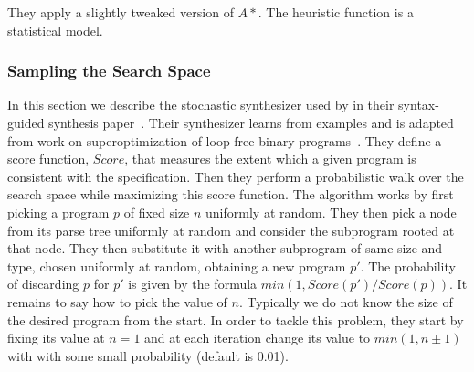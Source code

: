 They apply a slightly tweaked version of $A*$. The heuristic function is a
statistical model.



\subsubsection{Sampling the Search Space}
\label{sec:sygus-stochastic-solver}

In this section we describe the stochastic synthesizer used by
\citeauthor{Alur:sygus:2013} in their syntax-guided synthesis
paper~\cite{Alur:sygus:2013}. Their synthesizer learns from examples and is
adapted from work on superoptimization of loop-free binary
programs~\cite{Schkufza:2013:SS}. They define a score function, $Score$, that
measures the extent which a given program is consistent with the specification.
Then they perform a probabilistic walk over the search space while maximizing
this score function. The algorithm works by first picking a program $p$ of fixed
size $n$ uniformly at random. They then pick a node from its parse tree
uniformly at random and consider the subprogram rooted at that node. They then
substitute it with another subprogram of same size and type, chosen uniformly at
random, obtaining a new program $p'$. The probability of discarding $p$ for $p'$
is given by the formula $min(1, Score(p')/Score(p))$. It remains to say how to
pick the value of $n$. Typically we do not know the size of the desired program
from the start. In order to tackle this problem, they start by fixing its value
at $n = 1$ and at each iteration change its value to $min(1, n\pm{}1)$ with with
some small probability (default is 0.01).




